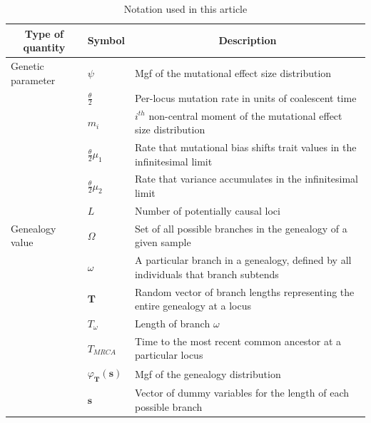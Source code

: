 \begin{table}
  \caption{Notation used in this article}
  \centering
  \begin{tabular}{l l l}
    \hline
    \multicolumn{1}{c}{Type of quantity} &\multicolumn{1}{c}{Symbol} & \multicolumn{1}{c}{Description} \\
    \hline
    Genetic parameter & $\psi$ & \multicolumn{1}{p{10cm}}{Mgf of the mutational effect size distribution }\\
                                         & $\frac{\theta}{2}$ & \multicolumn{1}{p{10cm}}{Per-locus mutation rate in units of coalescent time}\\
                                         & $m_i$ &  \multicolumn{1}{p{10cm}}{$i^{th}$ non-central moment of the mutational effect size distribution}\\
                                         & $\frac{\theta}{2}\mu_1$ & \multicolumn{1}{p{10cm}}{Rate that mutational bias shifts trait values in the infinitesimal limit}\\
                                         & $\frac{\theta}{2}\mu_2$ & \multicolumn{1}{p{10cm}}{Rate that variance accumulates in the infinitesimal limit}\\
                                         & $L$ & \multicolumn{1}{p{10cm}}{Number of potentially causal loci}\\
    Genealogy value &  $\Omega$ & \multicolumn{1}{p{10cm}}{Set of all possible branches in the genealogy of a given sample}\\
                                         & $\omega$ & \multicolumn{1}{p{10cm}}{A particular branch in a genealogy, defined by all individuals that branch subtends}\\
                                         & $\mathbf{T}$ & \multicolumn{1}{p{10cm}}{Random vector of branch lengths representing the entire genealogy at a locus}\\
                                         & $T_\omega$ & \multicolumn{1}{p{10cm}}{Length of branch $\omega$} \\
                                         & $T_{MRCA}$ & \multicolumn{1}{p{10cm}}{Time to the most recent common ancestor at a particular locus}\\
                                         & $\varphi_{\mathbf{T}}(\mathbf{s})$ & Mgf of the genealogy distribution \\
                                         & $\mathbf{s}$ & Vector of dummy variables for the length of each possible branch\\

\end{tabular}
\end{table}
